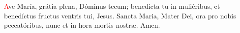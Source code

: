 \textcolor{red}{A}ve María, grátia plena, Dóminus tecum; benedicta tu in muliéribus, et benedíctus fructus ventris tui,
Jesus. Sancta Maria, Mater Dei, ora pro nobis peccatóribus, nunc et in hora mortis nostr{\ae}. Amen.